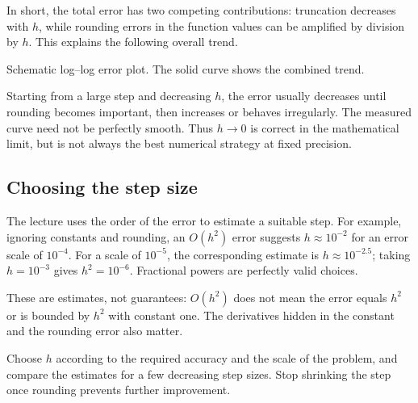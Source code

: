 In short, the total error has two competing contributions: truncation decreases with $h$, while rounding errors in the function values can be amplified by division by $h$. This explains the following overall trend.

\begin{center}

\small Schematic log--log error plot. The solid curve shows the combined trend.
\end{center}
Starting from a large step and decreasing $h$, the error usually decreases until rounding becomes important, then increases or behaves irregularly. The measured curve need not be perfectly smooth. Thus $h\to0$ is correct in the mathematical limit, but is not always the best numerical strategy at fixed precision.

\subsection{Choosing the step size}
The lecture uses the order of the error to estimate a suitable step. For example, ignoring constants and rounding, an $O(h^2)$ error suggests $h\approx10^{-2}$ for an error scale of $10^{-4}$. For a scale of $10^{-5}$, the corresponding estimate is $h\approx10^{-2.5}$; taking $h=10^{-3}$ gives $h^2=10^{-6}$. Fractional powers are perfectly valid choices.

These are estimates, not guarantees: $O(h^2)$ does not mean the error equals $h^2$ or is bounded by $h^2$ with constant one. The derivatives hidden in the constant and the rounding error also matter.

Choose $h$ according to the required accuracy and the scale of the problem, and compare the estimates for a few decreasing step sizes. Stop shrinking the step once rounding prevents further improvement.

